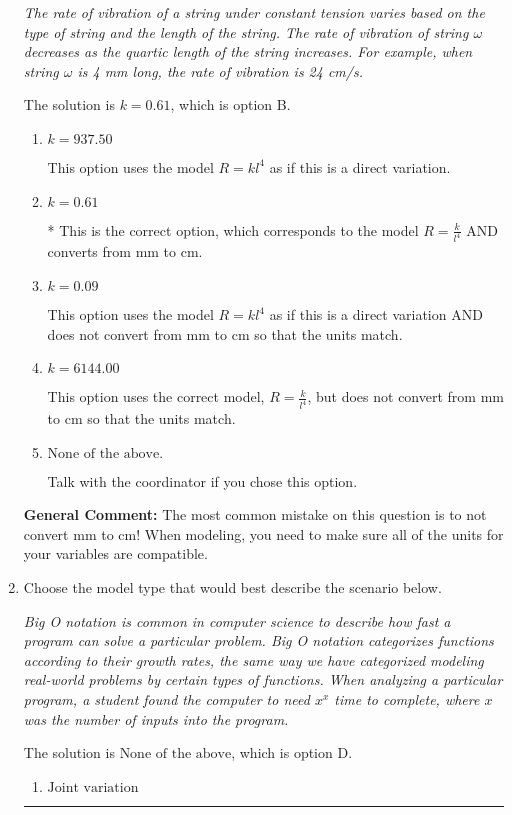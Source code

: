 \documentclass{extbook}[14pt]
\newcommand{\litem}[1]{\item #1

\rule{\textwidth}{0.4pt}}
\begin{document}
\begin{enumerate}
{\begin{center}
    \textit{ The rate of vibration of a string under constant tension varies based on the type of string and the length of the string. The rate of vibration of string $\omega$ decreases as the quartic length of the string increases. For example, when string $\omega$ is 4 mm long, the rate of vibration is 24 cm/s. }
\end{center}
The solution is \( k = 0.61 \), which is option B.\begin{enumerate}[label=\Alph*.]
\item \( k = 937.50 \)

This option uses the model $R = kl^{4}$ as if this is a direct variation.
\item \( k = 0.61 \)

* This is the correct option, which corresponds to the model $R = \frac{k}{l^{4}}$ AND converts from mm to cm.
\item \( k = 0.09 \)

This option uses the model $R = kl^{4}$ as if this is a direct variation AND does not convert from mm to cm so that the units match.
\item \( k = 6144.00 \)

This option uses the correct model, $R = \frac{k}{l^{4}}$, but does not convert from mm to cm so that the units match.
\item \( \text{None of the above.} \)

Talk with the coordinator if you chose this option.
\end{enumerate}

\textbf{General Comment:} The most common mistake on this question is to not convert mm to cm! When modeling, you need to make sure all of the units for your variables are compatible.
}
\litem{
Choose the model type that would best describe the scenario below.

\begin{center}
    \textit{ Big O notation is common in computer science to describe how fast a program can solve a particular problem. Big O notation categorizes functions according to their growth rates, the same way we have categorized modeling real-world problems by certain types of functions. When analyzing a particular program, a student found the computer to need $x^x$ time to complete, where $x$ was the number of inputs into the program. }
\end{center}
The solution is \( \text{None of the above} \), which is option D.\begin{enumerate}[label=\Alph*.]
\item \( \text{Joint variation} \)



\end{enumerate}}
\end{enumerate}
\end{document}
